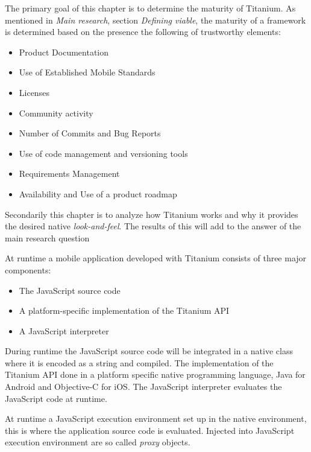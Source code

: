 


\noindent The primary goal of this chapter is to determine the maturity of Titanium. As mentioned in \emph{Main research}, section \emph{Defining viable}, the maturity of a framework is determined based on the presence the following of trustworthy elements:

\begin{itemize}
  \setlength{\itemsep}{1pt}
  \setlength{\parskip}{0pt}
  \setlength{\parsep}{0pt}
\item Product Documentation
\item Use of Established Mobile Standards
\item Licenses
\item Community activity
\item Number of Commits and Bug Reports
\item Use of code management and versioning tools
\item Requirements Management
\item Availability and Use of a product roadmap
\end{itemize}

Secondarily this chapter is to analyze how Titanium works and why it provides the desired native \emph{look-and-feel}. The results of this will add to the answer of the main research question






At runtime a mobile application developed with Titanium consists of three major components:
\begin{itemize}
	\item
	The JavaScript source code
	\item
	A platform-specific implementation of the Titanium API
	\item
	A JavaScript interpreter
\end{itemize}

During runtime the JavaScript source code will be integrated in a native class where it is encoded as a string and compiled. The implementation of the Titanium API done in a platform specific native programming language, Java for Android and Objective-C for iOS. The JavaScript interpreter evaluates the JavaScript code at runtime.


At runtime a JavaScript execution environment set up in the native environment, this is where the application source code is evaluated. Injected into JavaScript execution environment are so called \emph{proxy} objects.

